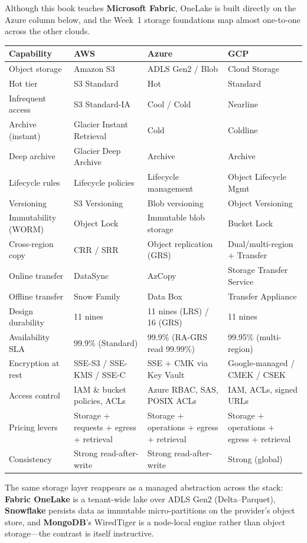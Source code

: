 \begin{crosscloud}
Although this book teaches \textbf{Microsoft Fabric}, OneLake is built directly on the Azure column below, and the Week~1 storage foundations map almost one-to-one across the other clouds.

\vspace{2mm}
{\footnotesize
\begin{tabular}{@{}p{2.8cm}p{3.0cm}p{3.0cm}p{3.0cm}@{}}
\toprule
\textbf{Capability} & \textbf{AWS} & \textbf{Azure} & \textbf{GCP} \\
\midrule
Object storage & Amazon S3 & ADLS Gen2 / Blob & Cloud Storage \\
Hot tier & S3 Standard & Hot & Standard \\
Infrequent access & S3 Standard-IA & Cool / Cold & Nearline \\
Archive (instant) & Glacier Instant Retrieval & Cold & Coldline \\
Deep archive & Glacier Deep Archive & Archive & Archive \\
Lifecycle rules & Lifecycle policies & Lifecycle management & Object Lifecycle Mgmt \\
Versioning & S3 Versioning & Blob versioning & Object Versioning \\
Immutability (WORM) & Object Lock & Immutable blob storage & Bucket Lock \\
Cross-region copy & CRR / SRR & Object replication (GRS) & Dual/multi-region + Transfer \\
Online transfer & DataSync & AzCopy & Storage Transfer Service \\
Offline transfer & Snow Family & Data Box & Transfer Appliance \\
\addlinespace
Design durability & 11 nines & 11 nines (LRS) / 16 (GRS) & 11 nines \\
Availability SLA & 99.9\% (Standard) & 99.9\% (RA-GRS read 99.99\%) & 99.95\% (multi-region) \\
Encryption at rest & SSE-S3 / SSE-KMS / SSE-C & SSE + CMK via Key Vault & Google-managed / CMEK / CSEK \\
Access control & IAM \& bucket policies, ACLs & Azure RBAC, SAS, POSIX ACLs & IAM, ACLs, signed URLs \\
Pricing levers & Storage + requests + egress + retrieval & Storage + operations + egress + retrieval & Storage + operations + egress + retrieval \\
Consistency & Strong read-after-write & Strong read-after-write & Strong (global) \\
\bottomrule
\end{tabular}}

\vspace{1mm}
The same storage layer reappears as a managed abstraction across the stack: \textbf{Fabric OneLake} is a tenant-wide lake over ADLS Gen2 (Delta--Parquet), \textbf{Snowflake} persists data as immutable micro-partitions on the provider's object store, and \textbf{MongoDB}'s WiredTiger is a node-local engine rather than object storage---the contrast is itself instructive.
\end{crosscloud}

